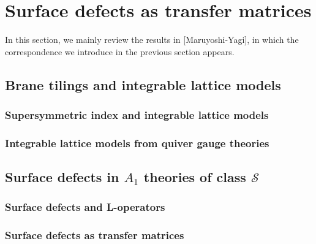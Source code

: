 




\section{Surface defects as transfer matrices}

In this section, we mainly review the results in [Maruyoshi-Yagi], in which the correspondence we introduce in the previous section appears. 







\subsection{Brane tilings and integrable lattice models}









\subsubsection{Supersymmetric index and integrable lattice models}








\subsubsection{Integrable lattice models from quiver gauge theories}








\subsection{Surface defects in $A_{1}$ theories of class $\mathcal{S}$}








\subsubsection{Surface defects and L-operators}









\subsubsection{Surface defects as transfer matrices}













